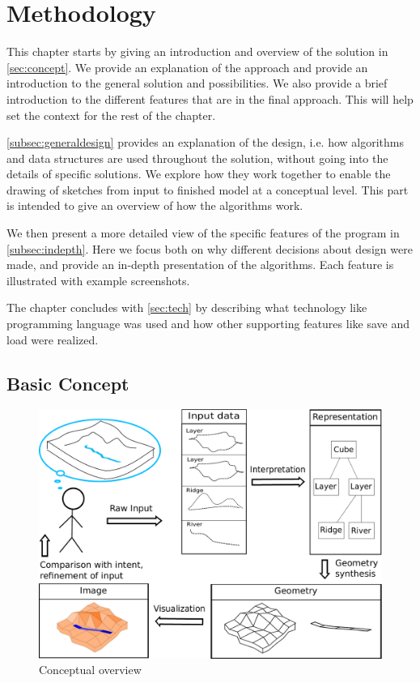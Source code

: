 \documentclass[a4paper,12pt]{report}
\newcommand{\secref}[1]{\autoref{#1}}
\begin{document}
\clearpage


\chapter{Methodology}
\label{sec:method}
This chapter starts by giving an introduction and overview of the solution in \secref{sec:concept}. We provide an explanation of the approach and provide an introduction to the general solution and possibilities. We also provide a brief introduction to the different features  that are in the final approach. This will help set the context for the rest of the chapter.

\secref{subsec:generaldesign} provides an explanation of the design, i.e. how algorithms and data structures are used throughout the solution, without going into the details of specific solutions. We explore how they work together to enable the drawing of sketches from input to finished model at a conceptual level. This part is intended to give an overview of how the algorithms work.

 We then present a more detailed view of the specific features of the program in \secref{subsec:indepth}. Here we focus both on why different decisions about design were made, and provide an in-depth presentation of the algorithms. Each feature is illustrated with example screenshots.

The chapter concludes with \secref{sec:tech} by describing what technology like programming language was used and how other supporting features like save and load were realized.

\pagebreak

\section{Basic Concept}
\label{sec:concept}

\begin{figure}[h]
 \includegraphics[width=\linewidth]{thesis/overviewConcept.pdf}
 \caption{Conceptual overview}
 \label{fig:overviewConcept}
\end{figure}
\end{document}
